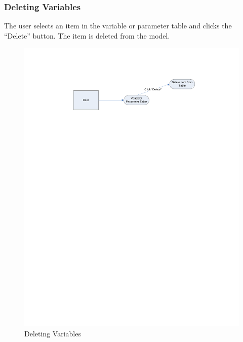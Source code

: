 \documentclass{article}
\begin{document}
\subsubsection{Deleting Variables}
The user selects an item in the variable or parameter table and clicks the ``Delete'' button. The item is deleted from the model.
\begin{figure}[!htb]
\centering
\includegraphics[width=\textwidth]{./diagrams/delete}
\caption{Deleting Variables}
\end{figure}
\end{document}
